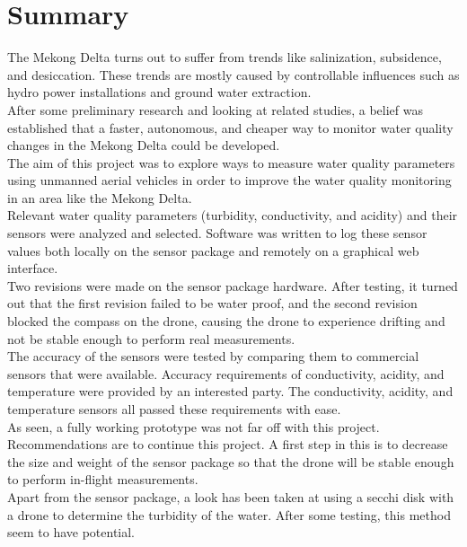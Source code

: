 \newpage
\section*{Summary}
The Mekong Delta turns out to suffer from trends like salinization, subsidence, and desiccation. These trends are mostly caused by controllable influences such as hydro power installations and ground water extraction.\\

After some preliminary research and looking at related studies, a belief was established that a faster, autonomous, and cheaper way to monitor water quality changes in the Mekong Delta could be developed.\\

The aim of this project was to explore ways to measure water quality parameters using unmanned aerial vehicles in order to improve the water quality monitoring in an area like the Mekong Delta.\\

Relevant water quality parameters (turbidity, conductivity, and acidity) and their sensors were analyzed and selected. Software was written to log these sensor values both locally on the sensor package and remotely on a graphical web interface.\\

Two revisions were made on the sensor package hardware. After testing, it turned out that the first revision failed to be water proof, and the second revision blocked the compass on the drone, causing the drone to experience drifting and not be stable enough to perform real measurements.\\

The accuracy of the sensors were tested by comparing them to commercial sensors that were available. Accuracy requirements of conductivity, acidity, and temperature were provided by an interested party. The conductivity, acidity, and temperature sensors all passed these requirements with ease.\\

As seen, a fully working prototype was not far off with this project. Recommendations are to continue this project. A first step in this is to decrease the size and weight of the sensor package so that the drone will be stable enough to perform in-flight measurements.\\

Apart from the sensor package, a look has been taken at using a secchi disk with a drone to determine the turbidity of the water. After some testing, this method seem to have potential.